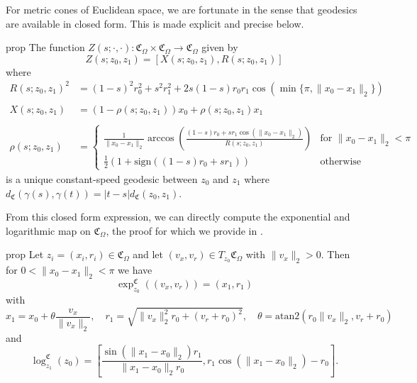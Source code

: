 \documentclass[11pt]{article}
\begin{document}
For metric cones of Euclidean space, we are fortunate in the sense that geodesics are available in closed form. This is made explicit and precise below.

\begin{restatable}{prop}{}
    The function $Z(s; \cdot, \cdot ):\mathfrak{C}_\Omega \times \mathfrak{C}_\Omega \rightarrow \mathfrak{C}_\Omega$ given by 
    \begin{equation} \label{eq: cone geodesics}
        Z(s; z_0, z_1) = \left[X\left(s; z_0, z_1\right) , R\left(s; z_0, z_1\right)\right]
    \end{equation}
    where
    \begin{align*}
        R(s; z_0, z_1)^2 &= (1-s)^2r_0^2 + s^2r_1^2 + 2s(1-s)r_0r_1\cos(\min\{\pi, \|x_0 - x_1\|_2\}) \\
        \\[0.25ex]X(s; z_0, z_1) &= (1 - \rho(s; z_0, z_1))x_0 + \rho(s; z_0, z_1)x_1 \\
        \\[0.05ex]\rho(s; z_0, z_1) &= \begin{cases}
            \frac{1}{\|x_0 - x_1\|_2}\arccos\left(\frac{(1-s)r_0 + sr_1\cos(\|x_0 - x_1\|_2)}{R(s; z_0, z_1)}\right) & \text{for }\|x_0 - x_1\|_2 < \pi \\
            \frac{1}{2}\left(1 + \text{sign}((1-s)r_0 + sr_1)\right) & \text{otherwise}
        \end{cases}
    \end{align*}
    is a unique constant-speed geodesic between $z_0$ and $z_1$ where $d_{\mathfrak{C}}(\gamma(s), \gamma(t)) = |t-s|d_{\mathfrak{C}}(z_0, z_1)$. 
\end{restatable}

From this closed form expression, we can directly compute the exponential and logarithmic map on $\mathfrak{C}_\Omega$, the proof for which we provide in .
\begin{restatable}{prop}{} \label{cone exponential and log map}
    Let $z_i = (x_i, r_i) \in \mathfrak{C}_{\Omega}$ and let $(v_x, v_r) \in T_{z_0}\mathfrak{C}_\Omega$ with $\|v_x\|_2 > 0$. Then for $0 < \|x_0 - x_1\|_2 < \pi$ we have
    \begin{equation} \label{eq: cone exp map}
        \exp^{\mathfrak{C}}_{z_0}((v_x, v_r)) = \left(x_1, r_1\right)
    \end{equation}
    with 
    \begin{equation*}
        x_1 = x_0 + \theta\frac{v_x}{\|v_x\|_2}, \quad r_1 = \sqrt{\|v_x\|_2^2r_0 + (v_r+r_0)^2}, \quad \theta = \text{atan2}(r_0\|v_x\|_2, v_r + r_0)
    \end{equation*}
    and 
    \begin{equation} \label{eq: cone log map}
        \log_{z_1}^\mathfrak{C}(z_0) = \left[\frac{\sin(\|x_1 - x_0\|_2)r_1}{\|x_1 - x_0\|_2r_0}, r_1\cos(\|x_1 - x_0\|_2) - r_0\right].
    \end{equation}
\end{restatable} 
\end{document}
